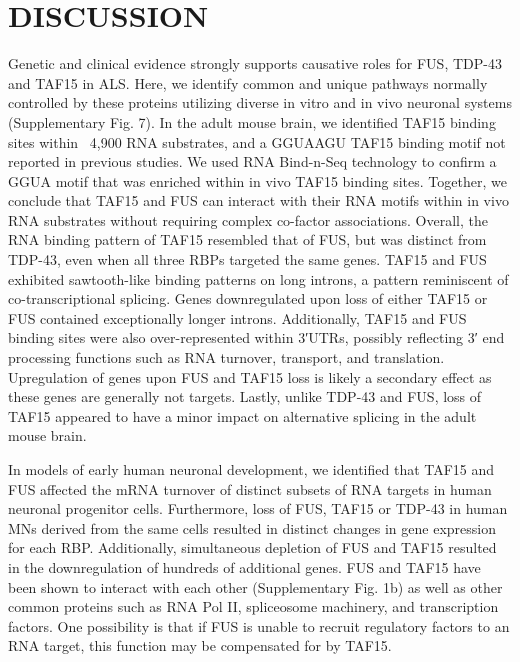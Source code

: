 \section{DISCUSSION}
Genetic and clinical evidence strongly supports causative roles for FUS, TDP-43 and TAF15 in ALS. Here, we identify common and unique pathways normally controlled by these proteins utilizing diverse in vitro and in vivo neuronal systems (Supplementary Fig. 7). In the adult mouse brain, we identified TAF15 binding sites within ~4,900 RNA substrates, and a GGUAAGU TAF15 binding motif not reported in previous studies\cite{Ibrahim2013,Hoell2011}. We used RNA Bind-n-Seq technology to confirm a GGUA motif that was enriched within in vivo TAF15 binding sites. Together, we conclude that TAF15 and FUS can interact with their RNA motifs within in vivo RNA substrates without requiring complex co-factor associations. Overall, the RNA binding pattern of TAF15 resembled that of FUS, but was distinct from TDP-43, even when all three RBPs targeted the same genes. TAF15 and FUS exhibited sawtooth-like binding patterns on long introns, a pattern reminiscent of co-transcriptional splicing\cite{Ameur2011}. Genes downregulated upon loss of either TAF15 or FUS contained exceptionally longer introns. Additionally, TAF15 and FUS binding sites were also over-represented within 3′UTRs, possibly reflecting 3′ end processing functions such as RNA turnover, transport, and translation. Upregulation of genes upon FUS and TAF15 loss is likely a secondary effect as these genes are generally not targets. Lastly, unlike TDP-43 and FUS, loss of TAF15 appeared to have a minor impact on alternative splicing in the adult mouse brain.

In models of early human neuronal development, we identified that TAF15 and FUS affected the mRNA turnover of distinct subsets of RNA targets in human neuronal progenitor cells. Furthermore,  loss of FUS, TAF15 or TDP-43 in human MNs derived from the same cells resulted in distinct changes in gene expression for each RBP. Additionally, simultaneous depletion of FUS and TAF15 resulted in the downregulation of  hundreds of additional genes. FUS and TAF15 have been shown to interact with each other\cite{Thomsen2013,Sun2015} (Supplementary Fig. 1b) as well as other common proteins such as RNA Pol II\cite{Schwartz2012,Kwon2013}, spliceosome machinery\cite{Sun2015,Jobert2009a,Yamazaki2012}, and transcription factors\cite{Bertolotti1996}. One possibility is that if FUS is unable to recruit regulatory factors to an RNA target, this function may be compensated for by TAF15.

